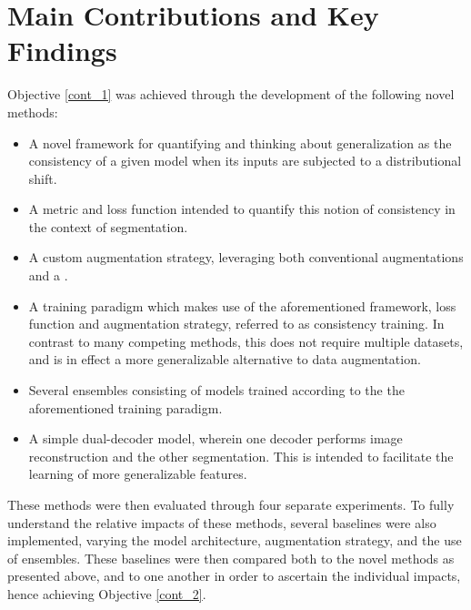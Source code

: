     \section{Main Contributions and Key Findings}
    Objective \ref{cont_1} was achieved through the development of the following novel methods:
    \begin{itemize}
        \item A novel framework for quantifying and thinking about generalization as the consistency of a given model when its inputs are subjected to a distributional shift.
        \item A metric and loss function intended to quantify this notion of consistency in the context of segmentation.
        \item A custom augmentation strategy, leveraging both conventional augmentations and a .
        \item A training paradigm which makes use of the aforementioned framework, loss function and augmentation strategy, referred to as consistency training. In contrast to many competing methods, this does not require multiple datasets, and is in effect a more generalizable alternative to data augmentation.
        \item Several ensembles consisting of models trained according to the the aforementioned training paradigm.
        \item A simple dual-decoder model, wherein one decoder performs image reconstruction and the other segmentation. This is intended to facilitate the learning of more generalizable features.
    \end{itemize}
    
    These methods were then evaluated through four separate experiments. To fully understand the relative impacts of these methods, several baselines were also implemented, varying the model architecture, augmentation strategy, and the use of ensembles. These baselines were then compared both to the novel methods as presented above, and to one another in order to ascertain the individual impacts, hence achieving Objective \ref{cont_2}.
    
